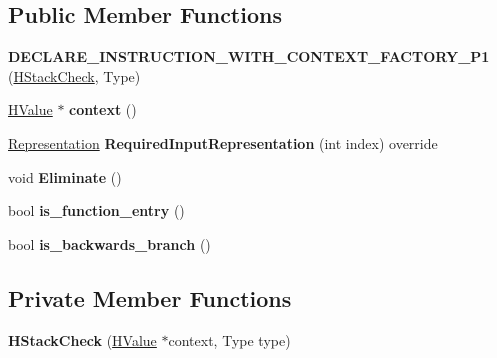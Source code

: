 \subsection*{Public Member Functions}
\begin{DoxyCompactItemize}
\item 
{\bfseries D\+E\+C\+L\+A\+R\+E\+\_\+\+I\+N\+S\+T\+R\+U\+C\+T\+I\+O\+N\+\_\+\+W\+I\+T\+H\+\_\+\+C\+O\+N\+T\+E\+X\+T\+\_\+\+F\+A\+C\+T\+O\+R\+Y\+\_\+\+P1} (\hyperlink{classv8_1_1internal_1_1_h_stack_check}{H\+Stack\+Check}, Type)\hypertarget{classv8_1_1internal_1_1_h_stack_check_a5f8daea4666dba868cd1ded0396b28c4}{}\label{classv8_1_1internal_1_1_h_stack_check_a5f8daea4666dba868cd1ded0396b28c4}

\item 
\hyperlink{classv8_1_1internal_1_1_h_value}{H\+Value} $\ast$ {\bfseries context} ()\hypertarget{classv8_1_1internal_1_1_h_stack_check_a803d9b413413a12caaa8eee87e909a51}{}\label{classv8_1_1internal_1_1_h_stack_check_a803d9b413413a12caaa8eee87e909a51}

\item 
\hyperlink{classv8_1_1internal_1_1_representation}{Representation} {\bfseries Required\+Input\+Representation} (int index) override\hypertarget{classv8_1_1internal_1_1_h_stack_check_aed2399af446ca265a8458bf6b36e2ed5}{}\label{classv8_1_1internal_1_1_h_stack_check_aed2399af446ca265a8458bf6b36e2ed5}

\item 
void {\bfseries Eliminate} ()\hypertarget{classv8_1_1internal_1_1_h_stack_check_a126a9dba13a1c9b99cda2dafc2837e49}{}\label{classv8_1_1internal_1_1_h_stack_check_a126a9dba13a1c9b99cda2dafc2837e49}

\item 
bool {\bfseries is\+\_\+function\+\_\+entry} ()\hypertarget{classv8_1_1internal_1_1_h_stack_check_a94fda73fb31c3b3fb513909e7469d17b}{}\label{classv8_1_1internal_1_1_h_stack_check_a94fda73fb31c3b3fb513909e7469d17b}

\item 
bool {\bfseries is\+\_\+backwards\+\_\+branch} ()\hypertarget{classv8_1_1internal_1_1_h_stack_check_ac2405dd9ed09f74163c00925b667f8b6}{}\label{classv8_1_1internal_1_1_h_stack_check_ac2405dd9ed09f74163c00925b667f8b6}

\end{DoxyCompactItemize}
\subsection*{Private Member Functions}
\begin{DoxyCompactItemize}
\item 
{\bfseries H\+Stack\+Check} (\hyperlink{classv8_1_1internal_1_1_h_value}{H\+Value} $\ast$context, Type type)\hypertarget{classv8_1_1internal_1_1_h_stack_check_ab2286e645f495d0e2515c6d0a5d66da7}{}\label{classv8_1_1internal_1_1_h_stack_check_ab2286e645f495d0e2515c6d0a5d66da7}

\end{DoxyCompactItemize}
